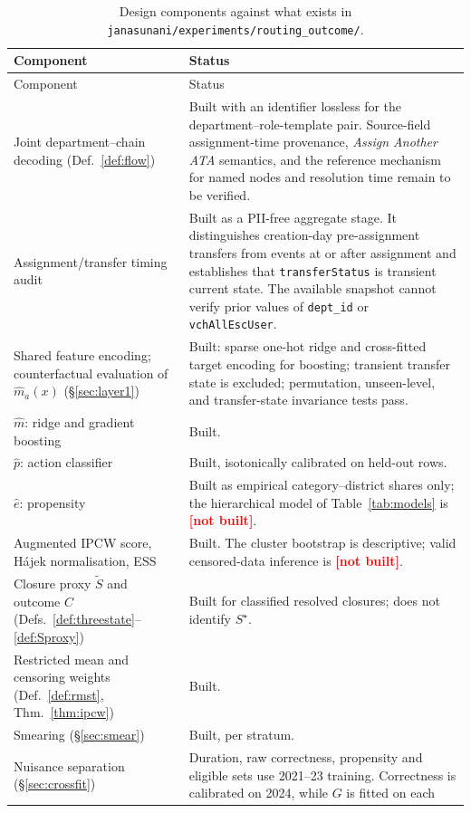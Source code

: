 \documentclass[11pt,a4paper]{article}
\theoremstyle{plain}
\theoremstyle{definition}
\theoremstyle{remark}
\newcommand{\code}[1]{\texttt{\small #1}}
\newcommand{\notbuilt}{\textcolor{red}{\textbf{[not built]}}}
\newcommand{\Sstar}{S^{\star}}
\newcommand{\Sproxy}{\widetilde S}
\begin{document}
\begin{longtable}{p{5.8cm}p{7.8cm}}
\caption{Design components against what exists in
\code{janasunani/experiments/routing\_outcome/}.}\label{tab:status}\\
\toprule
Component & Status\\
\midrule
\endfirsthead
\toprule
Component & Status\\
\midrule
\endhead
Joint department--chain decoding (Def.~\ref{def:flow}) & Built with an identifier lossless for
the department--role-template pair. Source-field assignment-time provenance, \emph{Assign
Another ATA} semantics, and the reference mechanism for named nodes and resolution time remain
to be verified.\\
Assignment/transfer timing audit & Built as a PII-free aggregate stage. It distinguishes
creation-day pre-assignment transfers from events at or after assignment and establishes that
\code{transferStatus} is transient current state. The available snapshot cannot verify prior
values of \code{dept\_id} or \code{vchAllEscUser}.\\
Shared feature encoding; counterfactual evaluation of $\hat m_a(x)$ (\S\ref{sec:layer1}) &
Built: sparse one-hot ridge and cross-fitted target encoding for boosting; transient transfer
state is excluded; permutation, unseen-level, and transfer-state invariance tests pass.\\
$\hat m$: ridge and gradient boosting & Built.\\
$\hat p$: action classifier & Built, isotonically calibrated on held-out rows.\\
$\hat e$: propensity & Built as empirical category--district shares only; the hierarchical model of Table~\ref{tab:models} is \notbuilt.\\
Augmented IPCW score, Hájek normalisation, ESS & Built. The cluster bootstrap is descriptive;
valid censored-data inference is \notbuilt.\\
Closure proxy $\Sproxy$ and outcome $C$ (Defs.~\ref{def:threestate}--\ref{def:Sproxy}) & Built for classified resolved closures; does not identify $\Sstar$.\\
Restricted mean and censoring weights (Def.~\ref{def:rmst}, Thm.~\ref{thm:ipcw}) & Built.\\
Smearing (\S\ref{sec:smear}) & Built, per stratum.\\
Nuisance separation (\S\ref{sec:crossfit}) & Duration, raw correctness, propensity and eligible
sets use 2021--23 training. Correctness is calibrated on 2024, while $G$ is fitted on each

\end{longtable}
\end{document}
